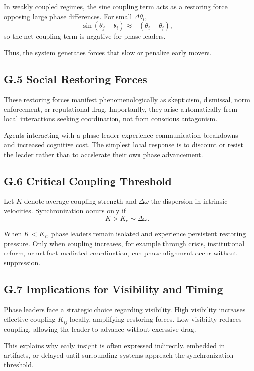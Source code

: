 \documentclass[11pt]{article}
\begin{document}
In weakly coupled regimes, the sine coupling term acts as a restoring force opposing large phase differences. For small \(\Delta \theta_i\),
\[
\sin(\theta_j - \theta_i) \approx -(\theta_i - \theta_j),
\]
so the net coupling term is negative for phase leaders.

Thus, the system generates forces that slow or penalize early movers.

\subsection{G.5 Social Restoring Forces}

These restoring forces manifest phenomenologically as skepticism, dismissal, norm enforcement, or reputational drag. Importantly, they arise automatically from local interactions seeking coordination, not from conscious antagonism.

Agents interacting with a phase leader experience communication breakdowns and increased cognitive cost. The simplest local response is to discount or resist the leader rather than to accelerate their own phase advancement.

\subsection{G.6 Critical Coupling Threshold}

Let \(K\) denote average coupling strength and \(\Delta \omega\) the dispersion in intrinsic velocities. Synchronization occurs only if
\[
K > K_c \sim \Delta \omega.
\]

When \(K < K_c\), phase leaders remain isolated and experience persistent restoring pressure. Only when coupling increases, for example through crisis, institutional reform, or artifact-mediated coordination, can phase alignment occur without suppression.

\subsection{G.7 Implications for Visibility and Timing}

Phase leaders face a strategic choice regarding visibility. High visibility increases effective coupling \(K_{ij}\) locally, amplifying restoring forces. Low visibility reduces coupling, allowing the leader to advance without excessive drag.

This explains why early insight is often expressed indirectly, embedded in artifacts, or delayed until surrounding systems approach the synchronization threshold.
\end{document}
